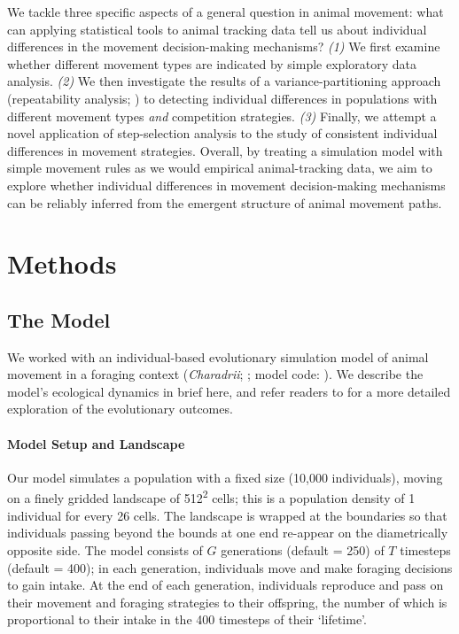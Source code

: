     We tackle three specific aspects of a general question in animal movement: what can applying statistical tools to animal tracking data tell us about individual differences in the movement decision-making mechanisms?
    \textit{(1)} We first examine whether different movement types are indicated by simple exploratory data analysis.
    \textit{(2)} We then investigate the results of a variance-partitioning approach (repeatability analysis; \citealt{nakagawa2010,hertel2019}) to detecting individual differences in populations with different movement types \textit{and} competition strategies.
    \textit{(3)} Finally, we attempt a novel application of step-selection analysis to the study of consistent individual differences in movement strategies.
    Overall, by treating a simulation model with simple movement rules as we would empirical animal-tracking data, we aim to explore whether individual differences in movement decision-making mechanisms can be reliably inferred from the emergent structure of animal movement paths.
    
    \section{Methods}
    
    \subsection*{The Model}
    
    We worked with an individual-based evolutionary simulation model of animal movement in a foraging context (\textit{Charadrii}; \citealt{gupte2021a}; model code: \citealt{netz2022a}).
    We describe the model's ecological dynamics in brief here, and refer readers to \cite{gupte2021a} for a more detailed exploration of the evolutionary outcomes.
    
    \paragraph*{Model Setup and Landscape}
    
    Our model simulates a population with a fixed size (10,000 individuals), moving on a finely gridded landscape of 512\textsuperscript{2} cells; this is a population density of 1 individual for every 26 cells.
    The landscape is wrapped at the boundaries so that individuals passing beyond the bounds at one end re-appear on the diametrically opposite side.
    The model consists of $G$ generations (default = 250) of $T$ timesteps (default = 400); in each generation, individuals move and make foraging decisions to gain intake.
    At the end of each generation, individuals reproduce and pass on their movement and foraging strategies to their offspring, the number of which is proportional to their intake in the 400 timesteps of their `lifetime'.
    
